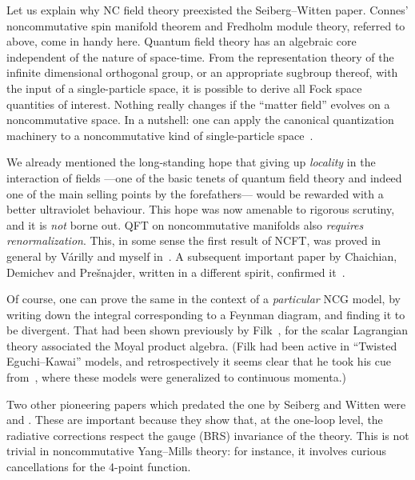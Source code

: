 \documentclass[a4paper,12pt]{article}
\providecommand{\1}{\mathbf{1}}         %
\providecommand{\7}{\dagger}            %
\providecommand{\8}{\bullet}            %
\renewcommand{\.}{\cdot}            %
\renewcommand{\:}{\colon}           %
\begin{document}
Let us explain why NC field theory preexisted the Seiberg--Witten
paper. Connes' noncommutative spin manifold theorem and Fredholm
module theory, referred to above, come in handy here. Quantum field
theory has an algebraic core independent of the nature of space-time.
From the representation theory of the infinite dimensional orthogonal
group, or an appropriate sugbroup thereof, with the input of a
single-particle space, it is possible to derive all Fock space
quantities of interest. Nothing really changes if the ``matter field''
evolves on a noncommutative space. In a nutshell: one can apply the
canonical quantization machinery to a noncommutative kind of
single-particle space~\cite{Atlas}.

We already mentioned the long-standing hope that giving up
\textit{locality} in the interaction of fields ---one of the basic
tenets of quantum field theory and indeed one of the main selling
points by the forefathers--- would be rewarded with a better
ultraviolet behaviour. This hope was now amenable to rigorous
scrutiny, and it is {\it not\/} borne out. QFT on noncommutative
manifolds also \textit{requires renormalization}. This, in some sense
the first result of NCFT, was proved in general by V\'arilly and
myself in~\cite{Atlas}. A subsequent important paper by Chaichian,
Demichev and Pre\v{s}najder, written in a different spirit, confirmed
it~\cite{ChaichianDP}.

Of course, one can prove the same in the context of a
\textit{particular} NCG model, by writing down the integral
corresponding to a Feynman diagram, and finding it to be divergent.
That had been shown previously by Filk~\cite{Filk}, for the scalar
Lagrangian theory associated the Moyal product algebra. (Filk had been
active in ``Twisted Eguchi--Kawai'' models, and retrospectively it
seems clear that he took his cue from~\cite{GonzalezAKA}, where these
models were generalized to continuous momenta.)

Two other pioneering papers which predated the one by Seiberg and
Witten were \cite{MartinSRone} and \cite{KrajewskiW}. These are important
because they show that, at the one-loop level, the radiative
corrections respect the gauge (BRS) invariance of the theory. This is
not trivial in noncommutative Yang--Mills theory: for instance, it
involves curious cancellations for the 4-point function.
\end{document}
